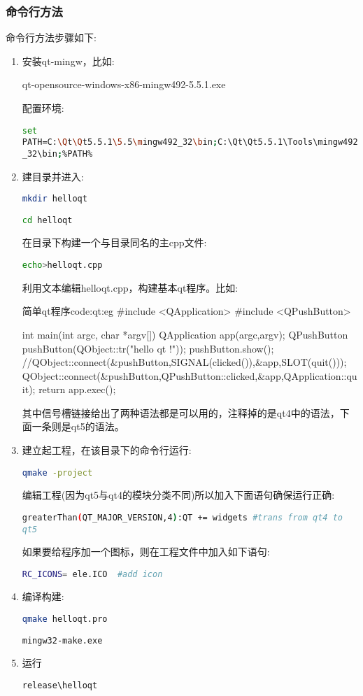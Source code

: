 \documentclass[11pt,twoside]{article} %
\begin{document}
\subsubsection{命令行方法}
命令行方法步骤如下:
\begin{enumerate}
  \item 安装qt-mingw，比如:

qt-opensource-windows-x86-mingw492-5.5.1.exe

配置环境:

\lstinline[language=bash,breaklines=true,keywordstyle=\color{blue}\bfseries]!set PATH=C:\Qt\Qt5.5.1\5.5\mingw492_32\bin;C:\Qt\Qt5.5.1\Tools\mingw492_32\bin;%PATH%!


  \item 建目录并进入:

\lstinline[language=bash,keywordstyle=\color{blue}\bfseries]!mkdir helloqt!

\lstinline[language=bash,keywordstyle=\color{blue}\bfseries]!cd helloqt!

在目录下构建一个与目录同名的主cpp文件:

\lstinline[language=bash,keywordstyle=\color{blue}\bfseries]!echo>helloqt.cpp!

利用文本编辑helloqt.cpp，构建基本qt程序。比如:

\begin{codecpp}{简单qt程序}{code:qt:eg}
#include <QApplication>
#include <QPushButton>

int main(int argc, char *argv[])
{
	QApplication app(argc,argv);
	QPushButton pushButton(QObject::tr("hello qt !"));
	pushButton.show();
	//QObject::connect(&pushButton,SIGNAL(clicked()),&app,SLOT(quit()));
	QObject::connect(&pushButton,QPushButton::clicked,&app,QApplication::quit);
	return app.exec();
}
\end{codecpp}

其中信号槽链接给出了两种语法都是可以用的，注释掉的是qt4中的语法，下面一条则是qt5的语法。

  \item 建立起工程，在该目录下的命令行运行:

\lstinline[language=bash]!qmake -project!

编辑工程(因为qt5与qt4的模块分类不同)所以加入下面语句确保运行正确:

\lstinline[language=bash]!greaterThan(QT_MAJOR_VERSION,4):QT += widgets #trans from qt4 to qt5!

如果要给程序加一个图标，则在工程文件中加入如下语句:

\lstinline[language=bash]!RC_ICONS= ele.ICO  #add icon!


  \item 编译构建:

\lstinline[language=bash]!qmake helloqt.pro!

\lstinline[language=bash]!mingw32-make.exe!


  \item 运行

\lstinline[language=bash]!release\helloqt!
\end{enumerate}
\end{document}
